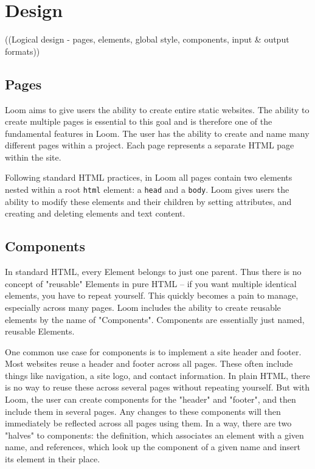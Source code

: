 \documentclass[conference, letterpaper]{IEEEtran}
\begin{document}
\section{Design}
((Logical design - pages, elements, global style, components, input \& output formats))

\subsection{Pages}
Loom aims to give users the ability to create entire static websites. The ability to create multiple pages is essential to this goal and is therefore one of the fundamental features in Loom. The user has the ability to create and name many different pages within a project. Each page represents a separate HTML page within the site.

Following standard HTML practices, in Loom all pages contain two elements nested within a root \texttt{html} element: a \texttt{head} and a \texttt{body}. Loom gives users the ability to modify these elements and their children by setting attributes, and creating and deleting elements and text content.

\subsection{Components}
In standard HTML, every Element belongs to just one parent. Thus there is no concept of "reusable" Elements in pure HTML – if you want multiple identical elements, you have to repeat yourself. This quickly becomes a pain to manage, especially across many pages. Loom includes the ability to create reusable elements by the name of "Components". Components are essentially just named, reusable Elements.

One common use case for components is to implement a site header and footer. Most websites reuse a header and footer across all pages. These often include things like navigation, a site logo, and contact information. In plain HTML, there is no way to reuse these across several pages without repeating yourself. But with Loom, the user can create components for the "header" and "footer", and then include them in several pages. Any changes to these components will then immediately be reflected across all pages using them. In a way, there are two "halves" to components: the definition, which associates an element with a given name, and references, which look up the component of a given name and insert its element in their place.
\end{document}
